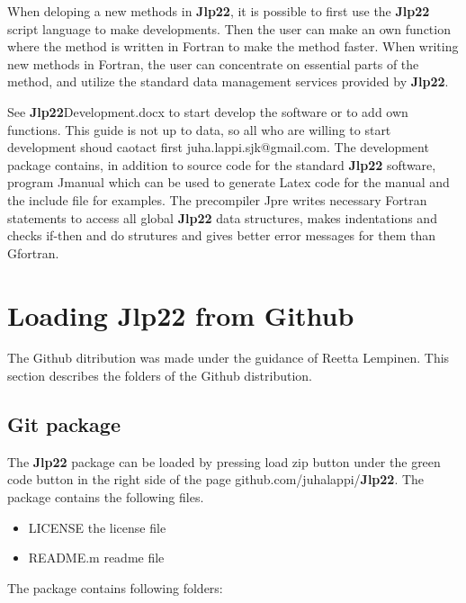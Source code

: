 When deloping a new methods in \textbf{Jlp22}, it is possible to first use the \textbf{Jlp22} 
script language to make developments. 
Then the user can make an own function where the method is written in Fortran to make the method faster. 
When writing new methods in Fortran, the user can concentrate on essential parts of the method, and utilize 
the standard data management services provided by \textbf{Jlp22}. 
 
 
See \textbf{Jlp22}Development.docx to start develop the software or to add 
own functions. This guide is not up to data, so all who are willing to start development shoud 
caotact first juha.lappi.sjk@gmail.com. The development package contains, in addition to source code for 
the standard \textbf{Jlp22} software, program Jmanual 
which can be used to generate Latex code for the manual and the include file for 
examples.   The precompiler Jpre  writes necessary Fortran statements to access all global 
\textbf{Jlp22} data structures, makes indentations and checks if-then and do strutures and gives 
better error messages for them than Gfortran. 
\section{ Loading \textbf{Jlp22} from Github} 
\label{git} 
The Github ditribution was made under the guidance of Reetta Lempinen. This section describes the 
folders of the Github distribution. 
\subsection{Git package} 
\label{gitpack} 
The \textbf{Jlp22}  package can be loaded by pressing load zip button under the green 
code button in the right side of the page github.com/juhalappi/\textbf{Jlp22}.  The package 
contains the following files. 
 
\begin{itemize} 
\item LICENSE the license file 
\item README.m readme file 
\end{itemize} 
 
The package contains following folders: 
 
